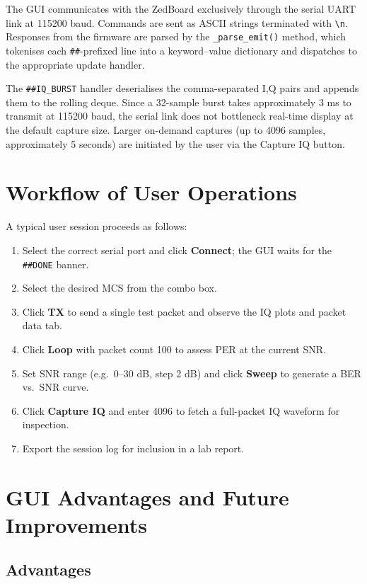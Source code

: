 \documentclass[12pt, a4paper, oneside]{report}
\begin{document}
The GUI communicates with the ZedBoard exclusively through the serial UART link at 115200 baud. Commands are sent as ASCII strings terminated with \texttt{\textbackslash n}. Responses from the firmware are parsed by the \texttt{\_parse\_emit()} method, which tokenises each \texttt{\#\#}-prefixed line into a keyword–value dictionary and dispatches to the appropriate update handler.

The \texttt{\#\#IQ\_BURST} handler deserialises the comma-separated I,Q pairs and appends them to the rolling deque. Since a 32-sample burst takes approximately 3 ms to transmit at 115200 baud, the serial link does not bottleneck real-time display at the default capture size. Larger on-demand captures (up to 4096 samples, approximately 5 seconds) are initiated by the user via the Capture IQ button.

\section{Workflow of User Operations}

A typical user session proceeds as follows:

\begin{enumerate}[noitemsep]
  \item Select the correct serial port and click \textbf{Connect}; the GUI waits for the \texttt{\#\#DONE} banner.
  \item Select the desired MCS from the combo box.
  \item Click \textbf{TX} to send a single test packet and observe the IQ plots and packet data tab.
  \item Click \textbf{Loop} with packet count 100 to assess PER at the current SNR.
  \item Set SNR range (e.g.\ 0–30 dB, step 2 dB) and click \textbf{Sweep} to generate a BER vs.\ SNR curve.
  \item Click \textbf{Capture IQ} and enter 4096 to fetch a full-packet IQ waveform for inspection.
  \item Export the session log for inclusion in a lab report.
\end{enumerate}

\section{GUI Advantages and Future Improvements}

\subsection{Advantages}
\end{document}
